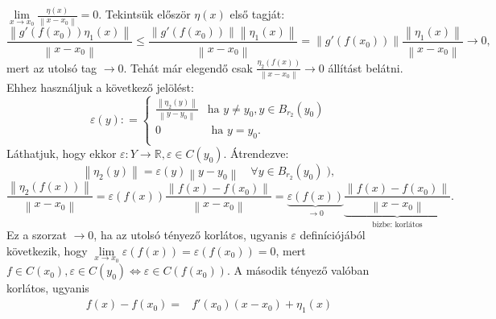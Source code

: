 \documentclass[12pt,a4paper]{scrartcl}
\newenvironment{bizonyitas}{}{}
\begin{document}
\begin{bizonyitas}
\(\underset{x\rightarrow x_{0}}{\lim}\frac{\eta\left( x \right)}{\left\| {x - x_{0}} \right\|} = 0\).
Tekintsük először \(\eta\left( x \right)\) első tagját:
\[\left. \frac{\left\| {g'\left( {f\left( x_{0} \right)} \right)\eta_{1}\left( x \right)} \right\|}{\left\| {x - x_{0}} \right\|} \leq \frac{\left\| {g'\left( {f\left( x_{0} \right)} \right)} \right\|\left\| {\eta_{1}\left( x \right)} \right\|}{\left\| {x - x_{0}} \right\|} = \left\| {g'\left( {f\left( x_{0} \right)} \right)} \right\|\frac{\left\| {\eta_{1}\left( x \right)} \right\|}{\left\| {x - x_{0}} \right\|}\rightarrow 0, \right.\]
mert az utolsó tag \(\left. \rightarrow 0 \right.\). Tehát már elegendő
csak
\(\left. \frac{\eta_{2}\left( {f\left( x \right)} \right)}{\left\| {x - x_{0}} \right\|}\rightarrow 0 \right.\)
állítást belátni. Ehhez használjuk a következő jelölést:
\[\varepsilon\left( y \right): = \begin{cases}
\frac{\left\| {\eta_{2}\left( y \right)} \right\|}{\left\| {y - y_{0}} \right\|} & {\text{ha~}y \neq y_{0},y \in B_{r_{2}}\left( y_{0} \right)} \\
0 & {\text{~ha~}y = y_{0}.} \\
\end{cases}\] Láthatjuk, hogy ekkor
\(\left. \varepsilon:Y\rightarrow{\mathbb{R}},\varepsilon \in C\left( y_{0} \right) \right.\).
Átrendezve:
\[{\left\| {\eta_{2}\left( y \right)} \right\| = \varepsilon\left( y \right)\left\| {y - y_{0}} \right\|\quad\forall y \in B_{r_{2}}\left( y_{0} \right)}\operatorname{),}\]
\[\frac{{\left\| {{\eta _2}\left( {f\left( x \right)} \right)} \right\|}}{{\left\| {x - {x_0}} \right\|}} = \varepsilon \left( {f\left( x \right)} \right)\frac{{\left\| {f\left( x \right) - f\left( {{x_0}} \right)} \right\|}}{{\left\| {x - {x_0}} \right\|}} = \underbrace {\varepsilon \left( {f\left( x \right)} \right)}_{ \to 0}\underbrace {\frac{{\left\| {f\left( x \right) - f\left( {{x_0}} \right)} \right\|}}{{\left\| {x - {x_0}} \right\|}}}_{{\text{bizbe: korlátos}}}.\]
Ez a szorzat \(\left. \rightarrow 0 \right.\), ha az utolsó tényező
korlátos, ugyanis \(\varepsilon\) definíciójából következik, hogy
\(\underset{x\rightarrow x_{0}}{\lim}\varepsilon\left( {f\left( x \right)} \right) = \varepsilon\left( {f\left( x_{0} \right)} \right) = 0\),
mert
\(\left. f \in C\left( x_{0} \right),\varepsilon \in C\left( y_{0} \right)\Leftrightarrow\varepsilon \in C\left( {f\left( x_{0} \right)} \right) \right.\).
A második tényező valóban korlátos, ugyanis \[\begin{aligned}
  f\left( x \right) - f\left( {{x_0}} \right) =  & f'\left( {{x_0}} \right)\left( {x - {x_0}} \right) + {\eta _1}\left( x \right) \\ 

\end{aligned}\]
\end{bizonyitas}
\end{document}

